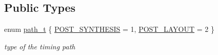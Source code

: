 \subsection*{Public Types}
\begin{DoxyCompactItemize}
\item 
enum \hyperlink{classtime__model_a1c11a9ae88bb0e54b5d97711e328dd87}{path\+\_\+t} \{ \hyperlink{classtime__model_a1c11a9ae88bb0e54b5d97711e328dd87a002d435f7c5b252d3619b37900a74b95}{P\+O\+S\+T\+\_\+\+S\+Y\+N\+T\+H\+E\+S\+IS} = 1, 
\hyperlink{classtime__model_a1c11a9ae88bb0e54b5d97711e328dd87a826ad0a96f8e03965a5ac22381ed675b}{P\+O\+S\+T\+\_\+\+L\+A\+Y\+O\+UT} = 2
 \}\begin{DoxyCompactList}\small\item\em type of the timing path \end{DoxyCompactList}
\end{DoxyCompactItemize}
